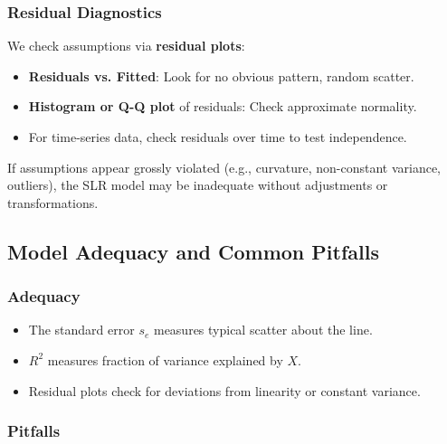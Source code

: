\documentclass[10pt, total={6in, 8in}]{extarticle}
\begin{document}
\subsubsection{Residual Diagnostics}

We check assumptions via \textbf{residual plots}:
\begin{itemize}
    \item \textbf{Residuals vs. Fitted}: Look for no obvious pattern, random scatter.
    \item \textbf{Histogram or Q-Q plot} of residuals: Check approximate normality.
    \item For time-series data, check residuals over time to test independence.
\end{itemize}

If assumptions appear grossly violated (e.g., curvature, non-constant variance, outliers), the SLR model may be inadequate without adjustments or transformations.



\subsection{Model Adequacy and Common Pitfalls}

\subsubsection{Adequacy}

\begin{itemize}
    \item The standard error $s_e$ measures typical scatter about the line.
    \item $R^2$ measures fraction of variance explained by $X$.
    \item Residual plots check for deviations from linearity or constant variance.
\end{itemize}

\subsubsection{Pitfalls}
\end{document}
